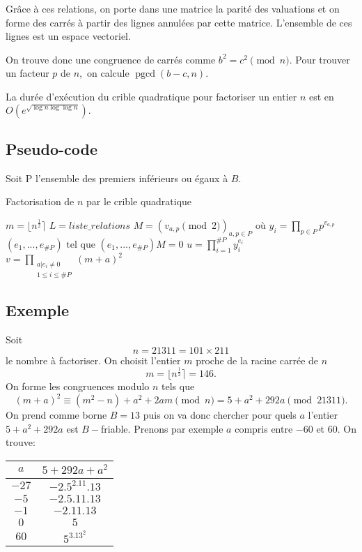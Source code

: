 \documentclass[french, 12pt, titlepage]{article}
\DeclareMathOperator{\pgcd}{pgcd}
\begin{document}
Grâce à ces relations, on porte dans une matrice la parité des valuations et on forme des carrés à partir des lignes annulées par cette matrice. L'ensemble de ces lignes est un espace vectoriel.

On trouve donc une congruence de carrés comme $b^2 = c^2 \pmod n.$ Pour trouver un facteur $p$ de $n,$ on calcule $\pgcd(b - c, n).$

La durée d'exécution du crible quadratique pour factoriser un entier $n$ est en $O(e^{\sqrt{\log n \log \log n}}).$

\subsection{Pseudo-code}
Soit P l'ensemble des premiers inférieurs ou égaux à $B.$

\begin{algorithm}
\caption{Factorisation de $n$ par le crible quadratique}
\BlankLine
$m = \lfloor n^{\frac{1}{2}} \rceil$\;
$L = liste\_relations$\;
$M = (v_{a, p} \pmod 2)_{a, p \in P} \text{ où } y_i = \prod\limits_{p \in P}p^{v_{a,p}}$\;
$(e_1, ..., e_{\#P}) \text{ tel que } (e_1, ..., e_{\#P})M = 0$\;
$u = \prod\limits_{i = 1}^{\#P} y_i^{e_i}$\;
$v = \prod\limits_{\substack{a | e_i \neq 0 \\ 1 \leq i \leq \#P}}^{} (m + a)^2$\;
\Return{$\pgcd(u - v, n)$}
\end{algorithm}

\subsection{Exemple}

Soit \[n = 21311 = 101 \times 211\] le nombre à factoriser. On choisit l'entier $m$ proche de la racine carrée de $n$ \[ m = \lfloor n^{\frac{1}{2}} \rceil = 146 .\]
On forme les congruences modulo $n$ tels que \[  (m + a)^2 \equiv (m^2 - n) + a^2 + 2am \pmod n = 5 + a^2 + 292a \pmod{21311} .\]
On prend comme borne $B = 13$ puis on va donc chercher pour quels $a$ l'entier $5 + a^2 + 292a$ est $B-$friable. Prenons par exemple $a$ compris entre $-60$ et $60$.
On trouve:

\begin{center}
\begin{tabular}{c|c}
$a$ & $5 + 292a + a^2$\\
\hline
$-27$ & $-2.5^2.11.13$\\
$ -5$ & $-2.5.11.13$\\
$-1$ & $-2.11.13$\\
$0$ & $5$\\
$60$ & $5^3.13^2$\\
\end{tabular}
\end{center}
\end{document}

